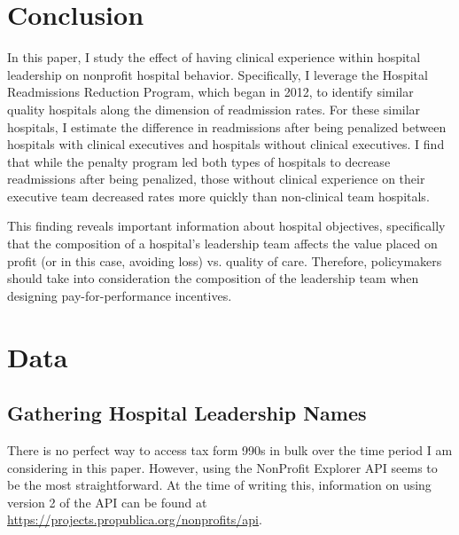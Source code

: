 \documentclass[12pt]{article}
\begin{document}
    \section{Conclusion}

    In this paper, I study the effect of having clinical experience within hospital leadership on nonprofit hospital behavior. Specifically, I leverage the Hospital Readmissions Reduction Program, which began in 2012, to identify similar quality hospitals along the dimension of readmission rates. For these similar hospitals, I estimate the difference in readmissions after being penalized between hospitals with clinical executives and hospitals without clinical executives. I find that while the penalty program led both types of hospitals to decrease readmissions after being penalized, those without clinical experience on their executive team decreased rates more quickly than non-clinical team hospitals. 

    This finding reveals important information about hospital objectives, specifically that the composition of a hospital's leadership team affects the value placed on profit (or in this case, avoiding loss) vs. quality of care. Therefore, policymakers should take into consideration the composition of the leadership team when designing pay-for-performance incentives.

	
	\newpage

    \printbibliography

\appendix

 \section{Data}\label{appendixdata}

\subsection{Gathering Hospital Leadership Names}

There is no perfect way to access tax form 990s in bulk over the time period I am considering in this paper. However, using the NonProfit Explorer API seems to be the most straightforward. At the time of writing this, information on using version 2 of the API can be found at \hyperlink{https://projects.propublica.org/nonprofits/api}{https://projects.propublica.org/nonprofits/api}. 
    
\end{document}
